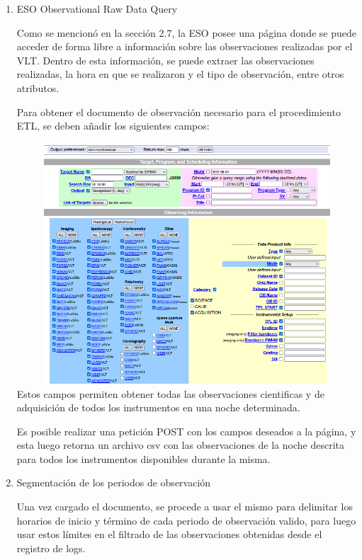 \begin{enumerate}

    \item{ESO Observational Raw Data Query}
    
    Como se mencionó en la sección 2.7, la ESO posee una página donde se puede acceder de forma libre a información sobre las observaciones realizadas por el VLT. Dentro de esta información, se puede extraer las observaciones realizadas, la hora en que se realizaron y el tipo de observación, entre otros atributos.
    
    Para obtener el documento de observación necesario para el procedimiento ETL, se deben añadir los siguientes campos:
    
    \includegraphics[width=13.5cm,height=9cm]{figures/eso_raw.png} \\
    
    Estos campos permiten obtener todas las observaciones cientificas y de adquisición de todos los instrumentos en una noche determinada.
    
    Es posible realizar una petición POST con los campos deseados a la página, y esta luego retorna un archivo csv con las observaciones de la noche descrita para todos los instrumentos disponibles durante la misma.

    \item{Segmentación de los periodos de observación}

    Una vez cargado el documento, se procede a usar el mismo para delimitar los horarios de inicio y término de cada periodo de observación valido, para luego usar estos límites en el filtrado de las observaciones obtenidas desde el registro de logs.


\end{enumerate}
